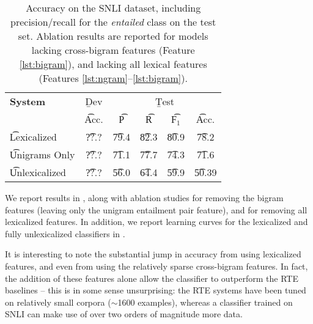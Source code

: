 \begin{table}
\begin{center}
\begin{tabular}{l@{\hskip \colspaceL}c@{\hskip \colspaceL}c@{\hskip \colspaceS}c@{\hskip \colspaceS}c@{\hskip \colspaceM}c}
\hline
\textbf{System} & \b{Dev} & \multicolumn{4}{c}{\b{Test}} \\
 & \t{Acc.} & \t{P} & \t{R} & \t{F$_1$} & \t{Acc.} \\
\hline
\t{Lexicalized}            & \t{??.?} & \t{79.4} & \t{82.3} & \t{80.9} & \t{78.2} \\
\t{Unigrams Only}          & \t{??.?} & \t{71.1} & \t{77.7} & \t{74.3} & \t{71.6} \\
\t{Unlexicalized}          & \t{??.?} & \t{56.0} & \t{64.4} & \t{59.9} & \t{50.39} \\
\hline
\end{tabular}
\end{center}
\caption{
\label{tab:bowresults}
Accuracy on the SNLI dataset, including precision/recall for the
  \textit{entailed} class on the test set.
Ablation results are reported for models lacking cross-bigram features 
  (Feature \ref{lst:bigram}), and lacking all lexical
  features (Features \ref{lst:ngram}--\ref{lst:bigram}).
}
\end{table}
%
%


We report results in , along with ablation studies for removing
  the bigram features (leaving only the unigram entailment pair feature),
  and for removing all lexicalized features.
In addition, we report learning curves for the lexicalized and fully unlexicalized
  classifiers in .

It is interesting to note the substantial jump in accuracy from using
  lexicalized features, and even from using the relatively sparse
  cross-bigram features.
In fact, the addition of these features alone allow the classifier to
  outperform the RTE baselines -- this is in some sense unsurprising:
  the RTE systems have been tuned on relatively small corpora
  ($\sim$1600 examples), whereas a classifier trained on SNLI can make use of
  over two orders of magnitude more data.

